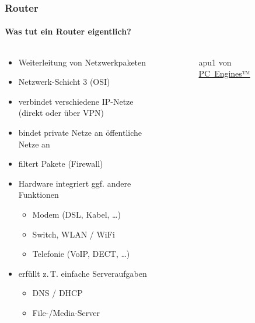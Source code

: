 \documentclass[t]{beamer}
\begin{document}
\begin{frame}
    \frametitle{Router}
    \framesubtitle{Was tut ein Router eigentlich?}
    \begin{columns}[T,onlytextwidth]
        \begin{column}{0.65\textwidth}
            \begin{itemize}
                \item Weiterleitung von Netzwerkpaketen
                \item Netzwerk-Schicht 3 (OSI)
                \item verbindet verschiedene IP-Netze\\(direkt oder über VPN)
                \item bindet private Netze an öffentliche Netze an
                \item filtert Pakete (Firewall)
                \item Hardware integriert ggf. andere Funktionen
                    \begin{itemize}
                        \item Modem (DSL, Kabel, …)
                        \item Switch, WLAN / WiFi
                        \item Telefonie (VoIP, DECT, …)
                    \end{itemize}
                \item erfüllt z.\,T. einfache Serveraufgaben
                    \begin{itemize}
                        \item DNS / DHCP
                        \item File-/Media-Server
                    \end{itemize}
            \end{itemize}
        \end{column}
        \begin{column}{0.35\textwidth}
            \begin{figure}
                \caption{apu1 von \href{https://pcengines.ch/apu.htm}{PC~Engines™}}
            \end{figure}
        \end{column}
    \end{columns}
\end{frame}
\end{document}
